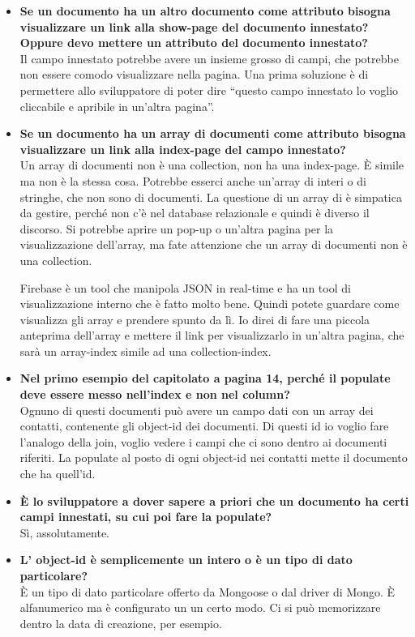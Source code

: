 \begin{itemize}
		\item
		{\bfseries Se un documento ha un altro documento come attributo bisogna visualizzare un link alla show-page del documento innestato? Oppure devo mettere un attributo del documento innestato?} \\
		Il campo innestato potrebbe avere un insieme grosso di campi, che potrebbe non essere comodo visualizzare nella pagina. Una prima soluzione è di permettere allo sviluppatore di poter dire ``questo campo innestato lo voglio cliccabile e apribile in un'altra pagina''.
		
		\item
		{\bfseries Se un documento ha un array di documenti come attributo bisogna visualizzare un link alla index-page del campo innestato?} \\
		Un array di documenti non è una collection, non ha una index-page. È simile ma non è la stessa cosa. Potrebbe esserci anche un'array di interi o di stringhe, che non sono di documenti. La questione di un array di è simpatica da gestire, perché non c'è nel database relazionale e quindi è diverso il discorso. Si potrebbe aprire un pop-up o un'altra pagina per la visualizzazione dell'array, ma fate attenzione che un array di documenti non è una collection.
		
		Firebase è un tool che manipola JSON in real-time e ha un tool di visualizzazione interno che è fatto molto bene. Quindi potete guardare come visualizza gli array e prendere spunto da lì. Io direi di fare una piccola anteprima dell'array e mettere il link per visualizzarlo in un'altra pagina, che sarà un array-index simile ad una collection-index.
		
		\item
		{\bfseries Nel primo esempio del capitolato a pagina 14, perché il populate deve essere messo nell'index e non nel column?} \\
		Ognuno di questi documenti può avere un campo dati con un array dei contatti, contenente gli object-id dei documenti. Di questi id io voglio fare l'analogo della join, voglio vedere i campi che ci sono dentro ai documenti riferiti. La populate al posto di ogni object-id nei contatti mette il documento che ha quell'id.
		
		\item
		{\bfseries È lo sviluppatore a dover sapere a priori che un documento ha certi campi innestati, su cui poi fare la populate?} \\
		Sì, assolutamente.
		
		\item
		{\bfseries L' object-id è semplicemente un intero o è un tipo di dato particolare?} \\
		È un tipo di dato particolare offerto da Mongoose o dal driver di Mongo. È alfanumerico ma è configurato un un certo modo. Ci si può memorizzare dentro la data di creazione, per esempio.
		

\end{itemize}
